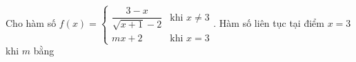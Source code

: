 \begin{ex}
Cho hàm số $f(x)=\begin{cases}\dfrac{3-x}{\sqrt{x+1}-2}&\text{khi }x\ne3\\mx+2&\text{khi }x=3\end{cases}$. Hàm số liên tục tại điểm $x=3$ khi $m$ bằng
\end{ex}
